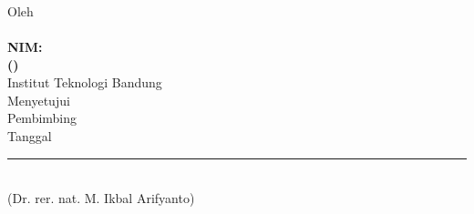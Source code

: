 \chapter*{}
\label{chp:pengesahan}
\begin{center}
  \textbf{\large
  \MakeUppercase{\titlename} }\\
  Oleh \\
  \textbf{{\large\authorname \\
    NIM: \authorid} \\
    (\department)} \\
  \vspace{\baselineskip}
  Institut Teknologi Bandung \\

  Menyetujui \\
  Pembimbing \\
  \vspace{\baselineskip}
  Tanggal \fullcompletiondate \\
  \rule{6cm}{1pt} \\
  (Dr. rer. nat. M. Ikbal Arifyanto)
\end{center}

\vspace{0.5cm} %

